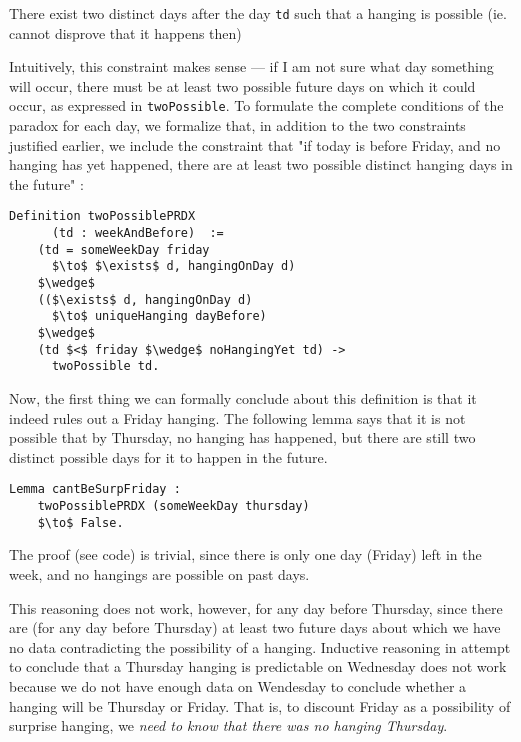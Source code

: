 \documentclass[journal]{journal}
\newenvironment{myindent}{\begin{adjustwidth}{1cm}{}}{\end{adjustwidth}}
\begin{document}
\begin{myindent}
  There exist two distinct days after the day {\tt td} such that
  a hanging is possible (ie. cannot disprove that it happens then)
\end{myindent}

Intuitively, this constraint makes sense --- if I am not sure what day something
will occur, there must be at least two possible future days on which it could occur,
as expressed in {\tt twoPossible}.
To formulate the complete conditions of the paradox for each day, we formalize that, in addition
to the two constraints justified earlier, we include the constraint that
"if today is before Friday, and no hanging has yet happened, there are at least
two possible distinct hanging days in the future" :

\begin{lstlisting}[mathescape=true]
  Definition twoPossiblePRDX
      (td : weekAndBefore)  :=
    (td = someWeekDay friday
      $\to$ $\exists$ d, hangingOnDay d)
    $\wedge$
    (($\exists$ d, hangingOnDay d)
      $\to$ uniqueHanging dayBefore)
    $\wedge$
    (td $<$ friday $\wedge$ noHangingYet td) ->
      twoPossible td.
\end{lstlisting}

Now, the first thing we can formally conclude about this definition is that it indeed rules out
a Friday hanging. The following lemma says that it is not possible that by Thursday,
no hanging has happened, but there are still two distinct possible days for it to
happen in the future.

\begin{lstlisting}[mathescape=true]
  Lemma cantBeSurpFriday :
    twoPossiblePRDX (someWeekDay thursday)
    $\to$ False.
\end{lstlisting}

The proof (see code) is trivial, since there is only one day (Friday) left in the week,
and no hangings are possible on past days.

This reasoning does not work, however, for any
day before Thursday, since there are (for any day before Thursday) at least two future
days about which we have no
data contradicting the possibility of a hanging.
Inductive reasoning in attempt to conclude that a Thursday hanging is
predictable on Wednesday does not work because we do not have enough data on Wendesday
to conclude whether a hanging will be Thursday or Friday. That is, to discount Friday
as a possibility of surprise hanging, we \emph{need to know that there was no
hanging Thursday}.
\end{document}

